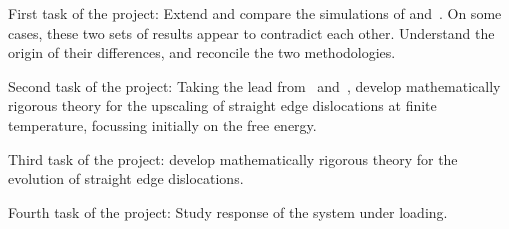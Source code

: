 \begin{workpackage}[id=WPkinetic,title=Kinetic control,wphases=1-48]
\begin{tasklist}

  \begin{task}[title=Reconcile the simulations]
    First task of the project: Extend and compare the simulations of \cite[Ch.~9]{VanMeurs15TH} and~\cite[Ch.~6]{Kooiman15TH}. On some cases, these two sets of results appear to contradict each other. Understand the origin of their differences, and reconcile the two methodologies.
  \end{task}

  \begin{task}[title=Upscaling the energy]
    Second task of the project: Taking the lead from~\cite[Ch.~2]{Kooiman15TH} and~\cite{SandierSerfaty12TR}, develop mathematically rigorous theory for the upscaling of straight edge dislocations at finite temperature, focussing initially on the free energy. 
  \end{task}
  
  \begin{task}[title=Upscaling the evolution]
    Third task of the project: develop mathematically rigorous theory for the evolution of straight edge dislocations. 
  \end{task}
  
  \begin{task}[title=Response]
    Fourth task of the project: Study response of the system under loading. 
  \end{task}
  
\end{tasklist}

\begin{wpdelivs}
\end{wpdelivs}
\end{workpackage}
